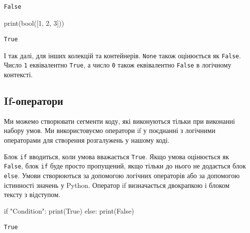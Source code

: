 \documentclass[
  letterpaper,
]{report}
\newenvironment{Shaded}{\begin{snugshade}}{\end{snugshade}}
\newcommand{\BuiltInTok}[1]{\textcolor[rgb]{0.00,0.23,0.31}{#1}}
\newcommand{\ControlFlowTok}[1]{\textcolor[rgb]{0.00,0.23,0.31}{#1}}
\newcommand{\DecValTok}[1]{\textcolor[rgb]{0.68,0.00,0.00}{#1}}
\newcommand{\NormalTok}[1]{\textcolor[rgb]{0.00,0.23,0.31}{#1}}
\newcommand{\StringTok}[1]{\textcolor[rgb]{0.13,0.47,0.30}{#1}}
\newcommand{\VariableTok}[1]{\textcolor[rgb]{0.07,0.07,0.07}{#1}}
\begin{document}
\begin{verbatim}
False
\end{verbatim}

\begin{Shaded}
\begin{Highlighting}[]
\BuiltInTok{print}\NormalTok{(}\BuiltInTok{bool}\NormalTok{([}\DecValTok{1}\NormalTok{, }\DecValTok{2}\NormalTok{, }\DecValTok{3}\NormalTok{]))}
\end{Highlighting}
\end{Shaded}

\begin{verbatim}
True
\end{verbatim}

І так далі, для інших колекцій та контейнерів. \texttt{None} також
оцінюється як \texttt{False}. Число \texttt{1} еквівалентно
\texttt{True}, а число \texttt{0} також еквівалентно \texttt{False} в
логічному контексті.

\hypertarget{if-ux43eux43fux435ux440ux430ux442ux43eux440ux438}{%
\subsection{If-оператори}\label{if-ux43eux43fux435ux440ux430ux442ux43eux440ux438}}

Ми можемо створювати сегменти коду, які виконуються тільки при виконанні
набору умов. Ми використовуємо оператори if у поєднанні з логічними
операторами для створення розгалужень у нашому коді.

Блок \texttt{if} вводиться, коли умова вважається \texttt{True}. Якщо
умова оцінюється як \texttt{False}, блок \texttt{if} буде просто
пропущений, якщо тільки до нього не додається блок \texttt{else}. Умови
створюються за допомогою логічних операторів або за допомогою істинності
значень у Python. Оператор if визначається двокрапкою і блоком тексту з
відступом.

\begin{Shaded}
\begin{Highlighting}[]
\ControlFlowTok{if} \StringTok{"Condition"}\NormalTok{:}
    \BuiltInTok{print}\NormalTok{(}\VariableTok{True}\NormalTok{)}
\ControlFlowTok{else}\NormalTok{:}
    \BuiltInTok{print}\NormalTok{(}\VariableTok{False}\NormalTok{)}
\end{Highlighting}
\end{Shaded}

\begin{verbatim}
True
\end{verbatim}
\end{document}
